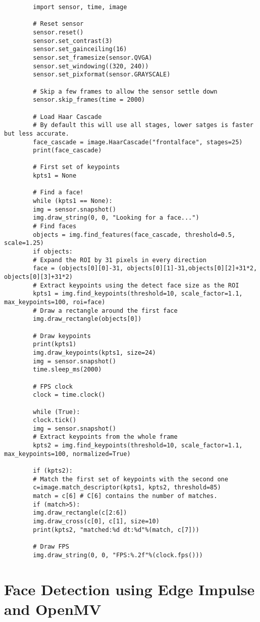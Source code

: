 	\begin{verbatim}
		import sensor, time, image
		
		# Reset sensor
		sensor.reset()
		sensor.set_contrast(3)
		sensor.set_gainceiling(16)
		sensor.set_framesize(sensor.QVGA)
		sensor.set_windowing((320, 240))
		sensor.set_pixformat(sensor.GRAYSCALE)
		
		# Skip a few frames to allow the sensor settle down
		sensor.skip_frames(time = 2000)
		
		# Load Haar Cascade
		# By default this will use all stages, lower satges is faster but less accurate.
		face_cascade = image.HaarCascade("frontalface", stages=25)
		print(face_cascade)
		
		# First set of keypoints
		kpts1 = None
		
		# Find a face!
		while (kpts1 == None):
		img = sensor.snapshot()
		img.draw_string(0, 0, "Looking for a face...")
		# Find faces
		objects = img.find_features(face_cascade, threshold=0.5, scale=1.25)
		if objects:
		# Expand the ROI by 31 pixels in every direction
		face = (objects[0][0]-31, objects[0][1]-31,objects[0][2]+31*2, objects[0][3]+31*2)
		# Extract keypoints using the detect face size as the ROI
		kpts1 = img.find_keypoints(threshold=10, scale_factor=1.1, max_keypoints=100, roi=face)
		# Draw a rectangle around the first face
		img.draw_rectangle(objects[0])
		
		# Draw keypoints
		print(kpts1)
		img.draw_keypoints(kpts1, size=24)
		img = sensor.snapshot()
		time.sleep_ms(2000)
		
		# FPS clock
		clock = time.clock()
		
		while (True):
		clock.tick()
		img = sensor.snapshot()
		# Extract keypoints from the whole frame
		kpts2 = img.find_keypoints(threshold=10, scale_factor=1.1, max_keypoints=100, normalized=True)
		
		if (kpts2):
		# Match the first set of keypoints with the second one
		c=image.match_descriptor(kpts1, kpts2, threshold=85)
		match = c[6] # C[6] contains the number of matches.
		if (match>5):
		img.draw_rectangle(c[2:6])
		img.draw_cross(c[0], c[1], size=10)
		print(kpts2, "matched:%d dt:%d"%(match, c[7]))
		
		# Draw FPS
		img.draw_string(0, 0, "FPS:%.2f"%(clock.fps()))
	\end{verbatim}

	\section{Face Detection using Edge Impulse and OpenMV}
	

